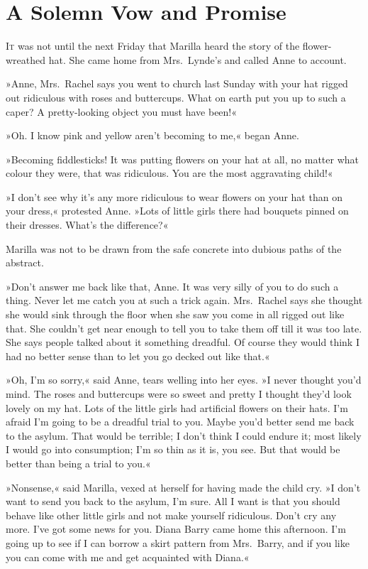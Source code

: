 \chapter{A Solemn Vow and Promise}

\lettrine[lines=4]{I}{t} was not until the next Friday that Marilla heard the story of the flower-wreathed hat. She came home from Mrs.~Lynde's and called Anne to account.

\zz
»Anne, Mrs.~Rachel says you went to church last Sunday with your hat rigged out ridiculous with roses and buttercups. What on earth put you up to such a caper? A pretty-looking object you must have been!«

»Oh. I know pink and yellow aren't becoming to me,« began Anne.

»Becoming fiddlesticks! It was putting flowers on your hat at all, no matter what colour they were, that was ridiculous. You are the most aggravating child!«

»I don't see why it's any more ridiculous to wear flowers on your hat than on your dress,« protested Anne. »Lots of little girls there had bouquets pinned on their dresses. What's the difference?«

Marilla was not to be drawn from the safe concrete into dubious paths of the abstract.

»Don't answer me back like that, Anne. It was very silly of you to do such a thing. Never let me catch you at such a trick again. Mrs.~Rachel says she thought she would sink through the floor when she saw you come in all rigged out like that. She couldn't get near enough to tell you to take them off till it was too late. She says people talked about it something dreadful. Of course they would think I had no better sense than to let you go decked out like that.«

»Oh, I'm so sorry,« said Anne, tears welling into her eyes. »I never thought you'd mind. The roses and buttercups were so sweet and pretty I thought they'd look lovely on my hat. Lots of the little girls had artificial flowers on their hats. I'm afraid I'm going to be a dreadful trial to you. Maybe you'd better send me back to the asylum. That would be terrible; I don't think I could endure it; most likely I would go into consumption; I'm so thin as it is, you see. But that would be better than being a trial to you.«

»Nonsense,« said Marilla, vexed at herself for having made the child cry. »I don't want to send you back to the asylum, I'm sure. All I want is that you should behave like other little girls and not make yourself ridiculous. Don't cry any more. I've got some news for you. Diana Barry came home this afternoon. I'm going up to see if I can borrow a skirt pattern from Mrs.~Barry, and if you like you can come with me and get acquainted with Diana.«

